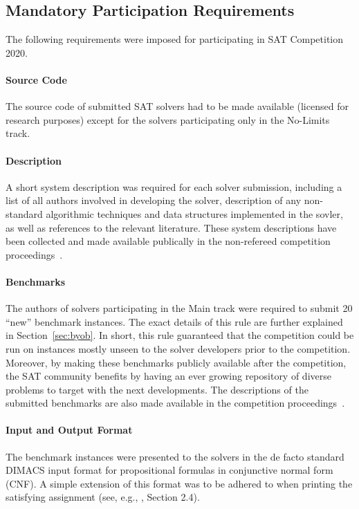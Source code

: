 \documentclass{elsarticle}
\begin{document}
\subsection{Mandatory Participation Requirements}
\label{sec:rules}

The following requirements were imposed for 
participating in SAT Competition 2020.

\paragraph{Source Code}
The source code of submitted SAT solvers had to be made available 
(licensed for research purposes) except for the solvers participating only in the No-Limits track.

\paragraph{Description}
A short system description was required for each solver submission,
including a list of all  authors involved in developing the solver,  description of any non-standard algorithmic
techniques and data structures implemented in the sovler, as well as references to the relevant literature.
These system descriptions have been collected and made available publically in the non-refereed competition
proceedings~\cite{SC2020}.

\paragraph{Benchmarks}
The authors of solvers participating in the Main track were required 
  to submit 20 ``new'' benchmark instances.
The exact details of this rule are further explained in Section~\ref{sec:byob}.
In short, this rule guaranteed that the competition could be run on instances mostly unseen to the solver
developers prior to the competition. Moreover, by making these benchmarks publicly available
after the competition, the SAT community benefits by having an ever growing repository 
of diverse problems to target with the next developments.
The descriptions of the submitted benchmarks are also made available in the competition proceedings~\cite{SC2020}.

\paragraph{Input and Output Format}

The benchmark instances were presented to the solvers in the de facto standard
DIMACS input format for propositional formulas in conjunctive normal form (CNF).
A simple extension of this format was to be adhered to when printing 
the satisfying assignment 
(see, e.g., \cite{DBLP:journals/jsat/HeuleJS19}, Section 2.4).
\end{document}
